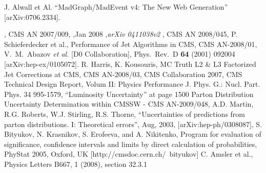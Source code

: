 \documentclass{cmspaper}
\begin{document}
\begin{linenumbers}
\begin{thebibliography}{}
  
  J. Alwall et Al.
  ``MadGraph/MadEvent v4: The New Web Generation''
  [arXiv:0706.2334].
  
  
, CMS AN 2007/009,
,Jan 2008 ,{\em arXiv 0411038v2}
, CMS AN 2008/045,
 {P. Schieferdecker et al., Performance of Jet Algorithms in CMS}, CMS AN-2008/01,
  V.~M.~Abazov {\it et al.}  [D0 Collaboration], 	 
  Phys.\ Rev.\  D {\bf 64} (2001) 092004 	 
  [arXiv:hep-ex/0105072]. 	 
 {R. Harris, K. Kousouris, MC Truth L2 \& L3 Factorized Jet Corrections at CMS}, CMS AN-2008/03,
 {CMS Collaboration 2007, CMS Technical Design Report, Volum II: Physics Performance} 
J. Phys. G.: Nucl. Part. Phys. 34 995-1579, ``Luminosity Uncertainty'' at page 1500
 {Parton Distribution Uncertainty Determination within CMSSW - CMS AN-2009/048}, %
 {A.D. Martin, R.G. Roberts, W.J. Stirling, R.S. Thorne, 
``Uncertainties of predictions from parton distributions. I: Theoretical errors'', Aug, 2003, [arXiv:hep-ph/0308087]},
 S. Bityukov, N. Krasnikov, S. Erofeeva, and A. Nikitenko, Program for evaluation of significance,
  confidence intervals and limits by direct calculation of probabilities, PhyStat 2005, Oxford, UK 
  [http://cmsdoc.cern.ch/~bityukov]
  C. Amsler et al., Physics Letters B667, 1 (2008), section 32.3.1
  
\end{thebibliography}

\end{linenumbers}
\end{document}
